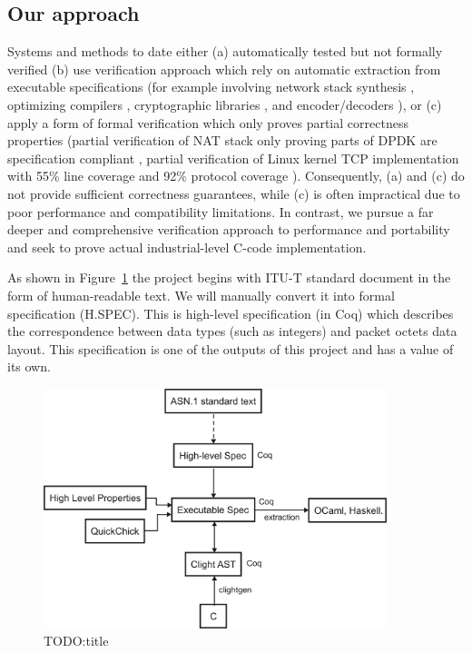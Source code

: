 \documentclass[acmsmall,nonacm]{acmart}
\begin{document}
\subsection{Our approach}

Systems and methods to date either (a) automatically tested but not
formally verified (b) use verification approach which rely on
automatic extraction from executable specifications (for example
involving network stack synthesis \cite{TODO:31}, optimizing compilers
\cite{TODO:3}, cryptographic libraries \cite{TODO:6}, and
encoder/decoders \cite{TODO:32}), or (c) apply a form of formal
verification which only proves partial correctness properties (partial
verification of NAT stack only proving parts of DPDK are specification
compliant \cite{TODO:33}, partial verification of Linux kernel TCP
implementation with 55\% line coverage and 92\% protocol coverage
\cite{TODO:34}). Consequently, (a) and (c) do not provide sufficient
correctness guarantees, while (c) is often impractical due to poor
performance and compatibility limitations. In contrast, we pursue a
far deeper and comprehensive verification approach to performance and
portability and seek to prove actual industrial-level C-code
implementation.

As shown in Figure~\ref{fig:components} the project begins with ITU-T
standard document in the form of human-readable text. We will manually
convert it into formal specification (H.SPEC). This is high-level
specification (in Coq) which describes the correspondence between data
types (such as integers) and packet octets data layout. This
specification is one of the outputs of this project and has a value of
its own.

\begin{figure}[h!]
  \centering
  \includegraphics[width=10cm]{VerificationArchitectureDiagram.png}
  \caption{TODO:title}
  \label{fig:components}
\end{figure}
\end{document}
